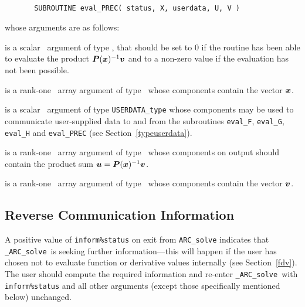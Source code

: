 \documentclass{galahad}
\newcommand{\packagename}{ARC}
\newcommand{\fullpackagename}{\libraryname\_\packagename}
\newcommand{\solver}{{\tt \fullpackagename\_solve}}
\begin{document}
\def\baselinestretch{0.8}
{\tt
\begin{verbatim}
       SUBROUTINE eval_PREC( status, X, userdata, U, V )
\end{verbatim} }
\def\baselinestretch{1.0}
\noindent whose arguments are as follows:

\begin{description}
 is a scalar \intentout\ argument of type \integer,
that should be set to 0 if the routine has been able to evaluate the
product ${\bm{P}}({\bm{x}})^{-1} {\bm{v}}$
and to a non-zero value if the evaluation has not been possible.

 is a rank-one \intentin\ array argument of type \realdp\
whose components contain the vector ${\bm{x}}$.

 is a scalar \intentinout\ argument of type
{\tt USERDATA\_type} whose components may be used
to communicate user-supplied data to and from the
subroutines {\tt eval\_F}, {\tt eval\_G},
{\tt eval\_H} and {\tt eval\_PREC}
(see Section~\ref{typeuserdata}).

 is a rank-one \intentout\ array argument of type \realdp\
whose components on output should contain the product
sum ${\bm{u}} = {\bm{P}}({\bm{x}})^{-1} {\bm{v}}$.

 is a rank-one \intentin\ array argument of type \realdp\
whose components contain the vector ${\bm{v}}$.

\end{description}


\subsection{\label{reverse}Reverse Communication Information}

A positive value of {\tt inform\%status} on exit from
{\tt \packagename\_solve}
indicates that
\solver\ is seeking further information---this will happen
if the user has chosen not to evaluate function or
derivative values internally (see Section~\ref{fdv}).
The user should compute the required information and re-enter \solver\
with {\tt inform\%status} and all other arguments (except those specifically
mentioned below) unchanged.
\end{document}
